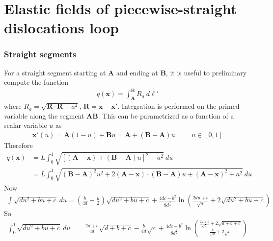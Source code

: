 
\chapter{Elastic fields of piecewise-straight dislocations loop}



\subsection{Straight segments}
For a straight segment starting at $\bm A$ and ending at $\bm B$, it is useful to preliminary compute the function
\begin{align}
q(\bm x)=\int_{\bm A}^{\bm B}R_a\ d\ell'
\end{align}
where $R_a=\sqrt{\bm R\cdot\bm R+a^2}$, $\bm R=\bm x-\bm x'$. Integration is performed on the primed variable along the segment $\bm A\bm B$. This can be parametrized as a function of a scalar variable $u$ as
\begin{align}
\bm x'(u)=\bm A(1-u)+\bm Bu=\bm A+(\bm B-\bm A)u\hspace{1cm} u\in[0,1]
\end{align}
Therefore
\begin{align}
q(\bm x)&=L\int_0^1\sqrt{[(\bm A-\bm x)+(\bm B-\bm A)u]^2+a^2}\ du\nonumber\\
&=L\int_0^1\sqrt{(\bm B-\bm A)^2u^2+2(\bm A-\bm x)\cdot(\bm B-\bm A)u+(\bm A-\bm x)^2+a^2}\ du
\end{align}
Now
\begin{align}
\int\sqrt{du^2+bu+c}\ du=\left(\frac{b}{4d}+\frac{u}{2}\right)\sqrt{du^2+bu+c}+\frac{4dc-b^2}{8d^\frac{3}{2}}\ln\left(\frac{2du+b}{\sqrt{d}}+2\sqrt{du^2+bu+c}\right)
\end{align}
So
\begin{align}
\int_0^1\sqrt{du^2+bu+c}\ du=&\frac{2d+b}{4d}\sqrt{d+b+c}-\frac{b}{4d}\sqrt{c}+\frac{4dc-b^2}{8d^\frac{3}{2}}\ln\left(\frac{\frac{2d+b}{\sqrt{d}}+2\sqrt{d+b+c}}{\frac{b}{\sqrt{d}}+2\sqrt{c}}\right)
\end{align}

